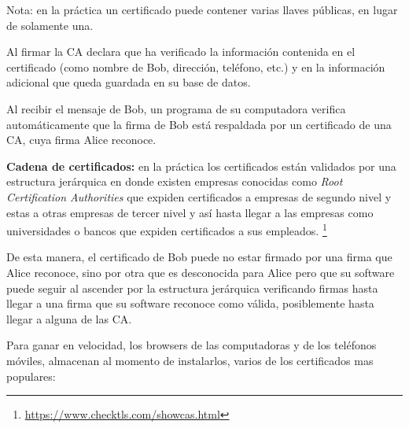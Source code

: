 \documentclass[12pt]{report} %
\begin{document}
 Nota: en la práctica un certificado puede contener varias llaves públicas, en lugar de solamente una.

Al firmar la CA declara que ha verificado la información contenida en el certificado (como nombre de Bob, dirección, teléfono, etc.) y en la información adicional que queda guardada en su base de datos. 

Al recibir el mensaje de Bob, un programa de su computadora verifica automáticamente que la firma de Bob está respaldada por un certificado de una CA, cuya firma Alice reconoce.

\textbf{Cadena de certificados:} en la práctica los certificados están validados por una estructura jerárquica en donde existen empresas conocidas como \textit{Root Certification Authorities} que expiden certificados a empresas de segundo nivel y estas a otras empresas de tercer nivel y así hasta llegar a las empresas como universidades o bancos que expiden certificados a sus empleados. \footnote{\url{https://www.checktls.com/showcas.html}}

De esta manera, el certificado de Bob puede no estar firmado por una firma que Alice reconoce, sino por otra que es desconocida para Alice pero que su software puede seguir al ascender por la estructura jerárquica verificando firmas hasta llegar a una firma que su software reconoce como válida, posiblemente hasta llegar a alguna de las CA.

Para ganar en velocidad, los browsers de las computadoras y de los teléfonos móviles,  almacenan al momento de instalarlos, varios de los certificados mas populares:
\end{document}
